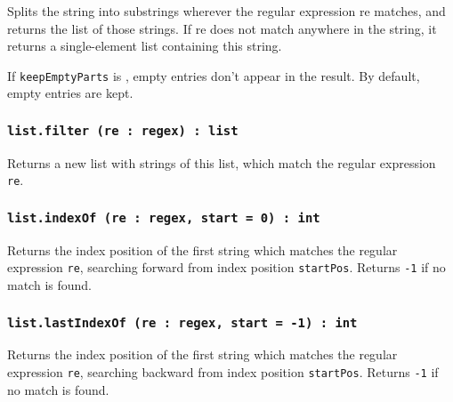 Splits the string into substrings wherever the regular expression {re} matches, and returns the list of those strings. If {re} does not match anywhere in the string, it returns a single-element list containing this string.

If \texttt{keepEmptyParts} is \false, empty entries don't appear in the result. By default, empty entries are kept.

\subsubsection{\texttt{list.filter (re : regex) : list}}

Returns a new list with strings of this list, which match the regular expression \texttt{re}.

\subsubsection{\texttt{list.indexOf (re : regex, start = 0) : int}}

Returns the index position of the first string which matches the regular expression \texttt{re}, searching forward from index position \texttt{startPos}. Returns \texttt{-1} if no match is found.

\subsubsection{\texttt{list.lastIndexOf (re : regex, start = -1) : int}}

Returns the index position of the first string which matches the regular expression \texttt{re}, searching backward from index position \texttt{startPos}. Returns \texttt{-1} if no match is found.

